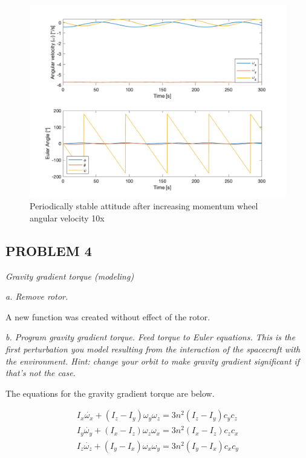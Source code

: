 \begin{figure}[H]
\centering
\includegraphics[scale=0.6]{Images/ps4_problem3e_stable.png}
\caption{Periodically stable attitude after increasing momentum wheel angular velocity 10x}
\label{fig:ps4_problem3e_stable.png}
\end{figure}

\subsection{PROBLEM 4}
\textit{Gravity gradient torque (modeling)}

\textit{a. Remove rotor.}

A new function was created without effect of the rotor.

\textit{b. Program gravity gradient torque. Feed torque to Euler equations. This is the first perturbation you model resulting from the interaction of the spacecraft with the environment. Hint: change your orbit to make gravity gradient significant if that’s not the case.}

The equations for the gravity gradient torque are below.

\begin{align*}
    I_x \dot{\omega_x} + (I_z - I_y) \omega_y \omega_z = 3 n^2 (I_z - I_y) c_y c_z \\
    I_y \dot{\omega_y} + (I_x - I_z) \omega_z \omega_x = 3 n^2 (I_x - I_z) c_z c_x \\
    I_z \dot{\omega_z} + (I_y - I_x) \omega_x \omega_y = 3 n^2 (I_y - I_x) c_x c_y \\
\end{align*}

